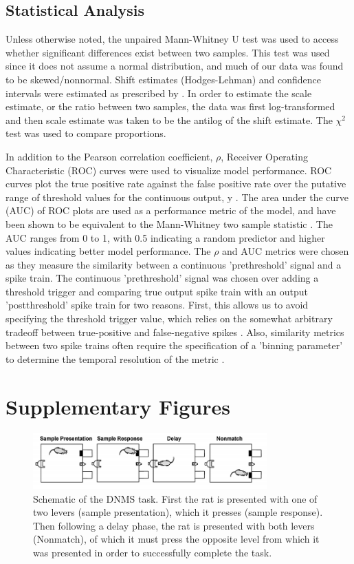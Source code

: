 \documentclass[11pt,a4paper,final]{article}
\begin{document}
    \subsection{Statistical Analysis}
Unless otherwise noted, the unpaired Mann-Whitney U test was used to access whether significant differences exist between two samples. This test was used since it does not assume a normal distribution, and much of our data was found to be skewed/nonnormal. Shift estimates (Hodges-Lehman) and confidence intervals were estimated as prescribed by \citet{higgins93}. In order to estimate the scale estimate, or the ratio between two samples, the data was first log-transformed and then scale estimate was taken to be the antilog of the shift estimate. The $\chi^2$ test was used to compare proportions.

In addition to the Pearson correlation coefficient, $\rho$, Receiver Operating Characteristic (ROC) curves were used to visualize model performance. ROC curves plot the true positive rate against the false positive rate over the putative range of threshold values for the continuous output, y \citep{zanos08}. The area under the curve (AUC) of ROC plots are used as a performance metric of the model, and have been shown to be equivalent to the Mann-Whitney two sample statistic \citep{hanely1982}. The AUC ranges from 0 to 1, with 0.5 indicating a random predictor and higher values indicating better model performance. The $\rho$ and AUC metrics were chosen as they measure the similarity between a continuous 'prethreshold' signal and a spike train. The continuous 'prethreshold' signal was chosen over adding a threshold trigger and comparing true output spike train with an output 'postthreshold' spike train for two reasons. First, this allows us to avoid specifying the threshold trigger value, which relies on the somewhat arbitrary tradeoff between true-positive and false-negative spikes \citep{marm13}. Also, similarity metrics between two spike trains often require the specification of a 'binning parameter' to determine the temporal resolution of the metric \citep{vanrossum01,victor97}.


\section{Supplementary Figures \label{SF}}

\begin{figure}[!ht]
\centering
\includegraphics[width=90mm]{DNMS}
\caption[DNMS Task Schematic]{
Schematic of the DNMS task. First the rat is presented with one of two levers (sample presentation), which it presses (sample response). Then following a delay phase, the rat is presented with both levers (Nonmatch), of which it must press the opposite level from which it was presented in order to successfully complete the task. }
\label{DNMS}
\end{figure}
\end{document}
